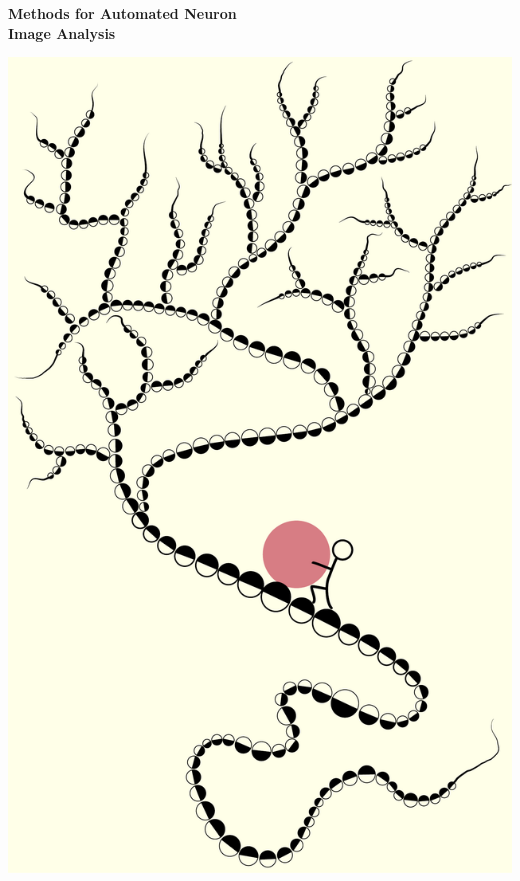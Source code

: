 %
%
\setlength{\parindent}{0pt}
\thispagestyle{empty}

\afterpage{\restorepagecolor} %

\vspace*{-2cm}
\begin{changemargin}{-0cm}{-0cm}

\begin{center}
	{\Huge\bf Methods for Automated Neuron \\[1ex] Image Analysis \\[2.2ex]}
\end{center}


\begin{center}
	\includegraphics[height=1.23\linewidth]{./cover/syziphus}
\end{center}


\end{changemargin}
